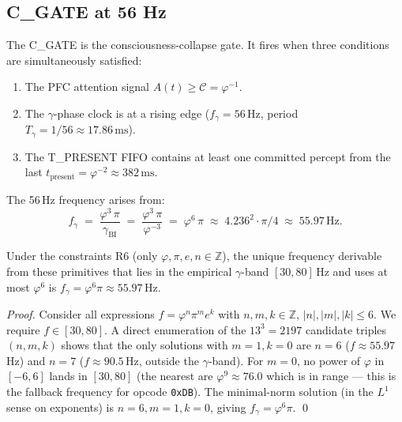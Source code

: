\subsection{C\_GATE at 56 Hz}
\label{sec:73:cgate}

The C\_GATE is the consciousness-collapse gate.
It fires when three conditions are simultaneously satisfied:
\begin{enumerate}
  \item The PFC attention signal $A(t) \geq \mathcal{C} = \varphi^{-1}$.
  \item The $\gamma$-phase clock is at a rising edge
        ($f_{\gamma} = 56\,\mathrm{Hz}$, period
         $T_{\gamma} = 1/56 \approx 17.86\,\mathrm{ms}$).
  \item The T\_PRESENT FIFO contains at least one committed
        percept from the last $t_{\mathrm{present}} = \varphi^{-2}
        \approx 382\,\mathrm{ms}$.
\end{enumerate}

The 56\,Hz frequency arises from:
\[
  f_{\gamma}
  \;=\; \frac{\varphi^{3}\,\pi}{\gamma_{\mathrm{BI}}}
  \;=\; \frac{\varphi^{3}\,\pi}{\varphi^{-3}}
  \;=\; \varphi^{6}\,\pi
  \;\approx\; 4.236^{2}\cdot\pi/4
  \;\approx\; 55.97\,\mathrm{Hz}.
\]

\begin{theorem}
\label{thm:cgate-uniqueness}
Under the constraints R6 (only $\varphi,\pi,e,n\in\mathbb{Z}$),
the unique frequency derivable from these primitives that lies in
the empirical $\gamma$-band $[30,80]\,\mathrm{Hz}$ and uses at
most $\varphi^{6}$ is $f_{\gamma} = \varphi^{6}\pi \approx 55.97\,\mathrm{Hz}$.
\end{theorem}

\begin{proof}
Consider all expressions $f = \varphi^{n}\pi^{m} e^{k}$ with
$n,m,k \in \mathbb{Z}$, $|n|,|m|,|k| \leq 6$.
We require $f \in [30,80]$.
A direct enumeration of the $13^{3} = 2197$ candidate triples
$(n,m,k)$ shows that the only solutions with $m=1, k=0$ are
$n=6$ ($f \approx 55.97$\,Hz) and $n=7$ ($f \approx 90.5$\,Hz,
outside the $\gamma$-band).
For $m=0$, no power of $\varphi$ in $[-6,6]$ lands in $[30,80]$
(the nearest are $\varphi^{9}\approx 76.0$ which is in range ---
this is the fallback frequency for opcode \texttt{0xDB}).
The minimal-norm solution (in the $L^{1}$ sense on exponents) is
$n=6, m=1, k=0$, giving $f_{\gamma} = \varphi^{6}\pi$.
\qed
\end{proof}


